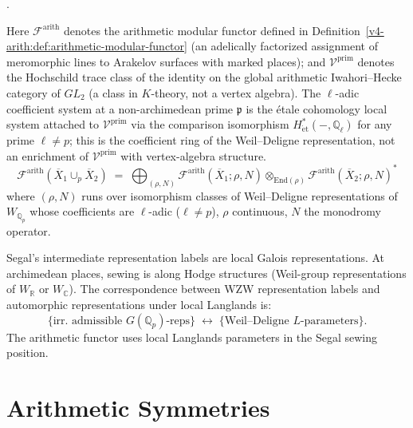 \begin{theorem}
\label{v4-arith:thm:weil-deligne-sewing}
\ClaimStatusConjectured.

Here \(\mathcal{F}^{\mathrm{arith}}\) denotes the arithmetic modular functor
defined in Definition~\ref{v4-arith:def:arithmetic-modular-functor}
(an adelically factorized assignment of meromorphic lines to Arakelov
surfaces with marked places); and \(\mathcal{V}^{\mathrm{prim}}\)
denotes the Hochschild trace class of the identity on the global
arithmetic Iwahori--Hecke category of \(GL_{2}\) (a class in
\(K\)-theory, not a vertex algebra). The \(\ell\)-adic coefficient
system at a non-archimedean prime \(\mathfrak{p}\) is the \'etale
cohomology local system attached to \(\mathcal{V}^{\mathrm{prim}}\)
via the comparison isomorphism \(H^{*}_{\mathrm{\acute{e}t}}(-,\mathbb{Q}_{\ell})\)
for any prime \(\ell\neq p\); this is the coefficient ring of the
Weil--Deligne representation, not an enrichment of \(\mathcal{V}^{\mathrm{prim}}\)
with vertex-algebra structure.
\begin{equation}
\mathcal{F}^{\mathrm{arith}}(\overline{X}_{1}\cup_{p}\overline{X}_{2})
\;=\;\bigoplus_{(\rho,N)}
\mathcal{F}^{\mathrm{arith}}(\overline{X}_{1};\rho,N)\otimes_{\mathrm{End}(\rho)}
\mathcal{F}^{\mathrm{arith}}(\overline{X}_{2};\rho,N)^{*}
\end{equation}
where \((\rho,N)\) runs over isomorphism classes of Weil--Deligne
representations of \(W_{\mathbb{Q}_{p}}\) whose coefficients are
\(\ell\)-adic (\(\ell\neq p\)),
\(\rho\) continuous, \(N\) the monodromy operator.
\end{theorem}

\begin{remark}
Segal's intermediate representation labels are local Galois
representations. At archimedean places, sewing is along Hodge
structures (Weil-group representations of \(W_{\mathbb{R}}\) or
\(W_{\mathbb{C}}\)). The correspondence between WZW representation
labels and automorphic representations under local Langlands is:
\begin{equation*}
\bigl\{\text{irr.~admissible }G(\mathbb{Q}_{p})\text{-reps}\bigr\}\;\leftrightarrow\;\bigl\{\text{Weil--Deligne }L\text{-parameters}\bigr\}.
\end{equation*}
The arithmetic functor uses local Langlands parameters in the Segal sewing position.
\end{remark}

\section{Arithmetic Symmetries}
\label{v4-arith:segal:MCG}

